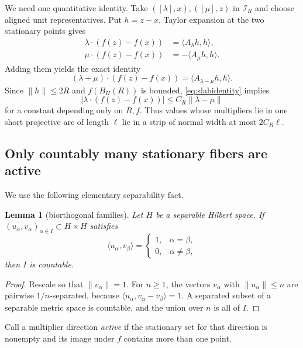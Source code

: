 \documentclass[11pt]{article}
\newtheorem{lemma}[theorem]{Lemma}
\begin{document}
We need one quantitative identity. Take $([\lambda],x),([\mu],z)$ in
$\mathcal I_R$ and choose aligned unit representatives. Put $h=z-x$. Taylor
expansion at the two stationary points gives
\begin{align*}
 \lambda\cdot(f(z)-f(x))&=\langle A_\lambda h,h\rangle,\\
 \mu\cdot(f(z)-f(x))&=-\langle A_\mu h,h\rangle.
\end{align*}
Adding them yields the exact identity
\begin{equation}\label{eq:slabidentity}
 (\lambda+\mu)\cdot(f(z)-f(x))
 =\langle A_{\lambda-\mu}h,h\rangle.
\end{equation}
Since $\|h\|\leq2R$ and $f(B_H(R))$ is bounded, \eqref{eq:slabidentity}
implies
\begin{equation}\label{eq:slab}
 |\lambda\cdot(f(z)-f(x))|
 \leq C_R\|\lambda-\mu\|
\end{equation}
for a constant depending only on $R,f$. Thus values whose multipliers lie in
one short projective arc of length $\ell$ lie in a strip of normal width at
most $2C_R\ell$.

\subsection{Only countably many stationary fibers are active}

We use the following elementary separability fact.

\begin{lemma}[biorthogonal families]\label{lem:biorthogonal}
Let $H$ be a separable Hilbert space. If
$(u_\alpha,v_\alpha)_{\alpha\in I}\subset H\times H$ satisfies
\[
 \langle u_\alpha,v_\beta\rangle=
 \begin{cases}
 1,&\alpha=\beta,\\
 0,&\alpha\ne\beta,
 \end{cases}
\]
then $I$ is countable.
\end{lemma}

\begin{proof}
Rescale so that $\|v_\alpha\|=1$. For $n\geq1$, the vectors $v_\alpha$ with
$\|u_\alpha\|\leq n$ are pairwise $1/n$-separated, because
$\langle u_\alpha,v_\alpha-v_\beta\rangle=1$. A separated subset of a
separable metric space is countable, and the union over $n$ is all of $I$.
\end{proof}

Call a multiplier direction \emph{active} if the stationary set for that
direction is nonempty and its image under $f$ contains more than one point.
\end{document}
